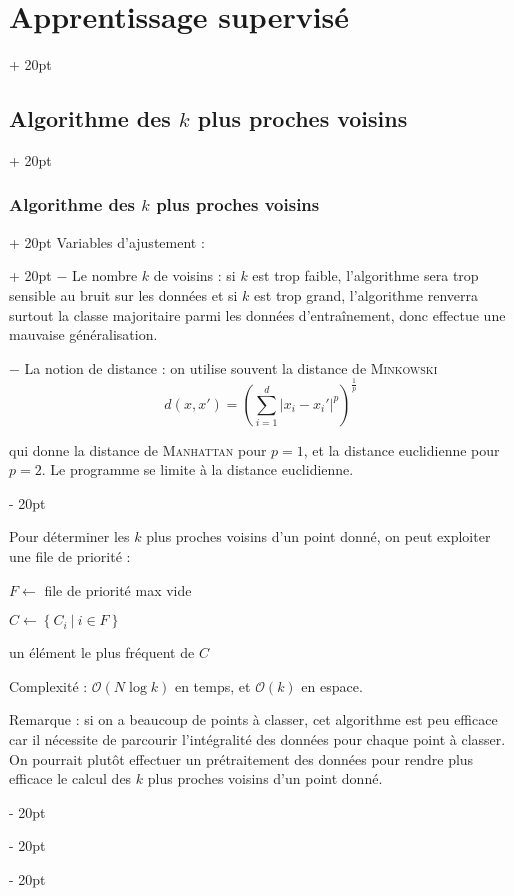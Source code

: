\documentclass[a4paper, 12pt, twoside]{article}
\newenvironment{indalgo}[2][H]{
    \begin{algoBox}
        \begin{algorithm}[#1]
            \caption{#2}
}
{
        \end{algorithm}
    \end{algoBox}
}
\newcommand{\nset}[2]{\left\llbracket #1\ ;\ #2 \right\rrbracket}
\newcommand{\lr}[1]{\left( #1 \right)}
\newcommand{\set}[1]{\left\{ #1 \right\}}
\newcommand{\abs}[1]{\left\lvert #1 \right\rvert}
\newcommand{\ind}[1][20pt]{\advance\leftskip + #1}
\newcommand{\deind}[1][20pt]{\advance\leftskip - #1}
\newenvironment{indt}[2][20pt]{#2 \par \ind[#1]}{\par \deind} %
\begin{document}
\begin{indt}{\section{Apprentissage supervisé}}
\begin{indt}{\subsection{Algorithme des $k$ plus proches voisins}}
\begin{indt}{\subsubsection{Algorithme des $k$ plus proches voisins}}
\begin{indt}{Variables d'ajustement :}
                    $-$ Le nombre $k$ de voisins : si $k$ est trop faible, l'algorithme sera trop sensible au bruit sur les données et si $k$ est trop grand, l'algorithme renverra surtout la classe majoritaire parmi les données d'entraînement, donc effectue une mauvaise généralisation.

                    $-$ La notion de distance : on utilise souvent la distance de \textsc{Minkowski}
                    \[
                        d(x, x') = \lr{\sum_{i = 1}^d \abs{x_i - x_i'}^p}^{\tfrac 1 p}
                    \]

                    qui donne la distance de \textsc{Manhattan} pour $p = 1$, et la distance euclidienne pour $p = 2$.
                    Le programme se limite à la distance euclidienne.
                \end{indt}

                Pour déterminer les $k$ plus proches voisins d'un point donné, on peut exploiter une file de priorité :

                \begin{indalgo}{$k$ plus proches voisins ($k$NN)}
                    \KwInput{données d'entraînement $\lr{x_i, y_i}_{i \in \nset 1 N}$}

                    \BlankLine

                    $F \gets$ file de priorité max vide\;



                    $C \gets \set{C_i\ |\ i \in F}$\;

                    \Return un élément le plus fréquent de $C$\;
                \end{indalgo}

                Complexité : $\mathcal O(N\log k)$ en temps, et $\mathcal O(k)$ en espace.

                \vspace{12pt}
                
                Remarque : si on a beaucoup de points à classer, cet algorithme est peu efficace car il nécessite de parcourir l'intégralité des données pour chaque point à classer. On pourrait plutôt effectuer un prétraitement des données pour rendre plus efficace le calcul des $k$ plus proches voisins d'un point donné.
            \end{indt}


\end{indt}
\end{indt}
\end{document}
